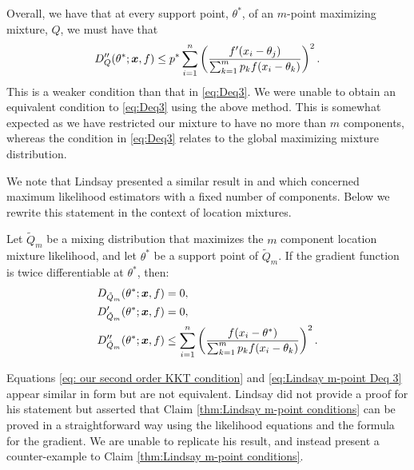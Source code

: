 	Overall, we have that at every support point, $\theta^*$, of an $m$-point maximizing mixture, $Q$, we must have that
	\begin{equation}
		D_Q''(\theta^*;{\bm{{x}}},f) \leq p^* \sum_{i = 1}^n \left(\frac{f'(x_i - \theta_j)}{\sum_{k = 1}^m p_k f(x_i - \theta_k)}\right)^2.
		\label{eq: our second order KKT condition}
	\end{equation}
	This is a weaker condition than that in \eqref{eq:Deq3}. We were unable to obtain an equivalent condition to \eqref{eq:Deq3} using the above method. This is somewhat expected as we have restricted our mixture to have no more than $m$ components, whereas the condition in \eqref{eq:Deq3} relates to the global maximizing mixture distribution.

	We note that Lindsay presented a similar result in \cite[Theorem 7.1]{Lindsay1983-tf} and \cite[Theorem 24]{Lindsay1995-sq} which concerned maximum likelihood estimators with a fixed number of components. Below we rewrite this statement in the context of location mixtures.
	\begin{claim}
	\label{thm:Lindsay m-point conditions}
		Let $\tilde{Q}_m$ be a mixing distribution that maximizes the $m$ component location mixture likelihood, and let $\theta^*$ be a support point of $\tilde{Q}_m$. If the gradient function is twice differentiable at $\theta^*$, then:
		\begin{align}
			D_{\tilde{Q}_m}(\theta^*; {\bm{{x}}}, f) &= 0,\\
			D_{\tilde{Q}_m}'(\theta^*; {\bm{{x}}}, f) &= 0,\\
			D_{\tilde{Q}_m}''(\theta^*; {\bm{{x}}}, f) &\leq \sum_{i = 1}^n \left(\frac{f(x_i - \theta^*)}{\sum_{k = 1}^m p_k f(x_i - \theta_k)}\right)^2.
			\label{eq:Lindsay m-point Deq 3}
		\end{align}
	\end{claim}

	Equations \eqref{eq: our second order KKT condition} and \eqref{eq:Lindsay m-point Deq 3} appear similar in form but are not equivalent. Lindsay did not provide a proof for his statement but asserted that Claim \ref{thm:Lindsay m-point conditions} can be proved in a straightforward way using the likelihood equations and the formula for the gradient. We are unable to replicate his result, and instead present a counter-example to Claim \ref{thm:Lindsay m-point conditions}.

